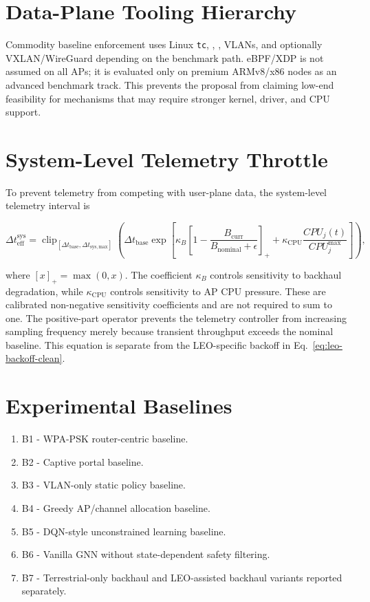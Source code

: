 \section{Data-Plane Tooling Hierarchy}
\label{sec:edge-tooling}

Commodity baseline enforcement uses Linux \texttt{tc}, \htb{}, \fqcodel{}, VLANs, and optionally VXLAN/WireGuard depending on the benchmark path. eBPF/XDP is not assumed on all APs; it is evaluated only on premium ARMv8/x86 nodes as an advanced benchmark track. This prevents the proposal from claiming low-end feasibility for mechanisms that may require stronger kernel, driver, and CPU support.

\section{System-Level Telemetry Throttle}
\label{sec:telemetry}

To prevent telemetry from competing with user-plane data, the system-level
telemetry interval is

\begin{equation}
\Delta t_{\mathrm{eff}}^{\mathrm{sys}}
=
\operatorname{clip}_{[\Delta t_{\mathrm{base}},\Delta t_{\mathrm{sys,max}}]}
\left(
\Delta t_{\mathrm{base}}
\exp
\left[
\kappa_B
\left[
1-
\frac{B_{\mathrm{curr}}}{B_{\mathrm{nominal}}+\epsilon}
\right]_+
+
\kappa_{\mathrm{CPU}}
\frac{CPU_j(t)}{CPU_j^{\max}}
\right]
\right),
\label{eq:system-telemetry-throttle-clean}
\end{equation}

where \([x]_+=\max(0,x)\). The coefficient $\kappa_B$ controls sensitivity to
backhaul degradation, while $\kappa_{\mathrm{CPU}}$ controls sensitivity to AP CPU
pressure. These are calibrated non-negative sensitivity coefficients and are not
required to sum to one. The positive-part operator prevents the telemetry controller
from increasing sampling frequency merely because transient throughput exceeds the
nominal baseline. This equation is separate from the LEO-specific backoff in
Eq.~\eqref{eq:leo-backoff-clean}.

\section{Experimental Baselines}
\label{sec:baselines}

\begin{enumerate}
  \item B1 - WPA-PSK router-centric baseline.
  \item B2 - Captive portal baseline.
  \item B3 - VLAN-only static policy baseline.
  \item B4 - Greedy AP/channel allocation baseline.
  \item B5 - DQN-style unconstrained learning baseline.
  \item B6 - Vanilla GNN without state-dependent safety filtering.
  \item B7 - Terrestrial-only backhaul and LEO-assisted backhaul variants reported separately.
\end{enumerate}

